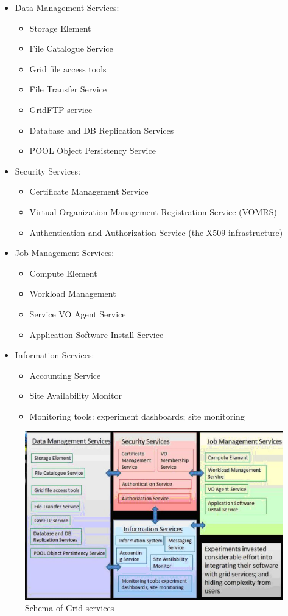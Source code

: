 \begin{itemize}
\item Data Management Services:
%
\begin{itemize}
\item Storage Element
\item File Catalogue Service
\item Grid file access tools
\item File Transfer Service
\item GridFTP service
\item Database and DB Replication Services
\item POOL Object Persistency Service
\end{itemize}
%
\item Security Services:
%
\begin{itemize}
\item Certificate Management Service
\item Virtual Organization \cite{VO} Management Registration Service (VOMRS)
\item Authentication and Authorization Service (the X509 infrastructure)
\end{itemize}
%
\item Job Management Services:
%
\begin{itemize}
\item Compute Element
\item Workload Management
\item Service VO Agent Service
\item Application Software Install Service
\end{itemize}
%
\item Information Services:
%
\begin{itemize}
\item Accounting Service
\item Site Availability Monitor
\item Monitoring tools: experiment dashboards; site monitoring
\end{itemize}
%
\end{itemize}

\begin{figure}[htb] %
\centering
\includegraphics[width=13cm]{fig10.eps} %
\caption{Schema of Grid services}\label{fig10}
\end{figure}



